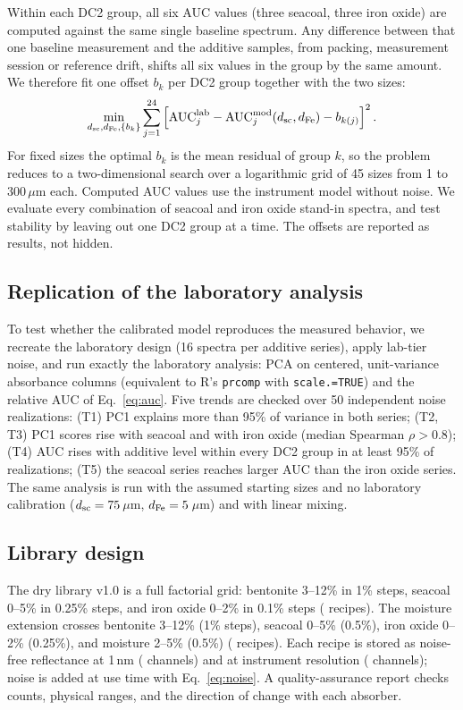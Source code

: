 \documentclass[10pt,twocolumn,letterpaper]{article}
\newcommand{\um}{\,$\mu$m}
\begin{document}
Within each DC2 group, all six AUC values (three seacoal, three iron oxide) are computed against the same single baseline spectrum. Any difference between that one baseline measurement and the additive samples, from packing, measurement session or reference drift, shifts all six values in the group by the same amount. We therefore fit one offset $b_k$ per DC2 group together with the two sizes:
\begin{equation}
\min_{d_{\rm sc},d_{\rm Fe},\{b_k\}}\sum_{j=1}^{24}\left[\mathrm{AUC}^{\rm lab}_j-\mathrm{AUC}^{\rm mod}_j(d_{\rm sc},d_{\rm Fe})-b_{k(j)}\right]^2.\label{eq:cal}
\end{equation}
For fixed sizes the optimal $b_k$ is the mean residual of group $k$, so the problem reduces to a two-dimensional search over a logarithmic grid of 45 sizes from 1 to 300\um{} each. Computed AUC values use the instrument model without noise. We evaluate every combination of seacoal and iron oxide stand-in spectra, and test stability by leaving out one DC2 group at a time. The offsets are reported as results, not hidden.

\subsection{Replication of the laboratory analysis}

To test whether the calibrated model reproduces the measured behavior, we recreate the laboratory design (16 spectra per additive series), apply lab-tier noise, and run exactly the laboratory analysis: PCA on centered, unit-variance absorbance columns (equivalent to R's \texttt{prcomp} with \texttt{scale.=TRUE}) and the relative AUC of Eq.~\eqref{eq:auc}. Five trends are checked over 50 independent noise realizations: (T1) PC1 explains more than 95\% of variance in both series; (T2, T3) PC1 scores rise with seacoal and with iron oxide (median Spearman $\rho>0.8$); (T4) AUC rises with additive level within every DC2 group in at least 95\% of realizations; (T5) the seacoal series reaches larger AUC than the iron oxide series. The same analysis is run with the assumed starting sizes and no laboratory calibration ($d_{\rm sc}=75$\um, $d_{\rm Fe}=5$\um) and with linear mixing.

\subsection{Library design}

The dry library v1.0 is a full factorial grid: bentonite 3--12\% in 1\% steps, seacoal 0--5\% in 0.25\% steps, and iron oxide 0--2\% in 0.1\% steps (\nDry{} recipes). The moisture extension crosses bentonite 3--12\% (1\% steps), seacoal 0--5\% (0.5\%), iron oxide 0--2\% (0.25\%), and moisture 2--5\% (0.5\%) (\nMoist{} recipes). Each recipe is stored as noise-free reflectance at 1\,nm (\nNative{} channels) and at instrument resolution (\nInst{} channels); noise is added at use time with Eq.~\eqref{eq:noise}. A quality-assurance report checks counts, physical ranges, and the direction of change with each absorber.
\end{document}
